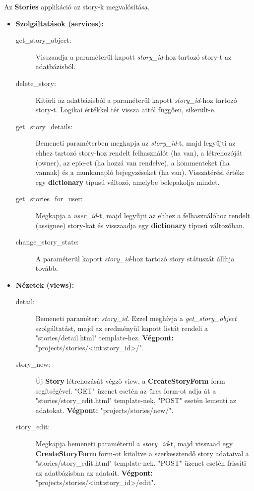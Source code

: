 Az \textbf{Stories} applikáció az story-k megvalósítása. 

\begin{itemize}
	\item \textbf{Szolgáltatások (services):}
	\begin{description}
		\item[get\_story\_object:] Visszaadja a paraméterül kapott \textit{story\_id}-hoz tartozó story-t az adatbázisból.
		\item[delete\_story:] Kitörli az adatbázisból a paraméterül kapott \textit{story\_id}-hoz tartozó story-t. Logikai értékkel tér vissza attól függően, sikerült-e.
		\item[get\_story\_details:] Bemeneti paraméterben megkapja az  \textit{story\_id}-t, majd legyűjti az ehhez tartozó story-hoz rendelt felhasználót (ha van), a létrehozóját (owner), az epic-et (ha hozzá van rendelve), a kommenteket (ha vannak) és a munkanapló bejegyzéseket (ha van). Visszatérési értéke egy \textbf{dictionary} típusú változó, amelybe belepakolja mindet.
		\item[get\_stories\_for\_user:] Megkapja a \textit{user\_id}-t, majd legyűjti az ehhez a felhasználóhoz rendelt (assignee) story-kat és visszaadja egy \textbf{dictionary} típusú változóban.
		\item[change\_story\_state:] A paraméterül kapott \textit{story\_id}-hoz tartozó story státuszát állítja tovább.
	\end{description}
	\item \textbf{Nézetek (views):}
	\begin{description}
		\item[detail:] Bemeneti paraméter: \textit{story\_id}. Ezzel meghívja a \textit{get\_story\_object} szolgáltatást, majd az eredményül kapott listát rendeli a "stories/detail.html" template-hez. \textbf{Végpont:} "projects/stories/<int:story\_id>/".
		\item[story\_new:] Új \textbf{Story} létrehozását végző view, a \textbf{CreateStoryForm} form segítségével. "GET" üzenet esetén az üres form-ot adja át a "stories/story\_edit.html" template-nek, "POST" esetén lementi az adatokat. \textbf{Végpont:} "projects/stories/new/".
		\item[story\_edit:] Megkapja bemeneti paraméterül a \textit{story\_id}-t, majd visszaad egy \textbf{CreateStoryForm} form-ot kitöltve a szerkesztendő story adataival a "stories/story\_edit.html" template-nek. "POST" üzenet esetén frissíti az adatbázisban az adatait. \textbf{Végpont:} "projects/stories/<int:story\_id>/edit".

\end{description}
\end{itemize}
